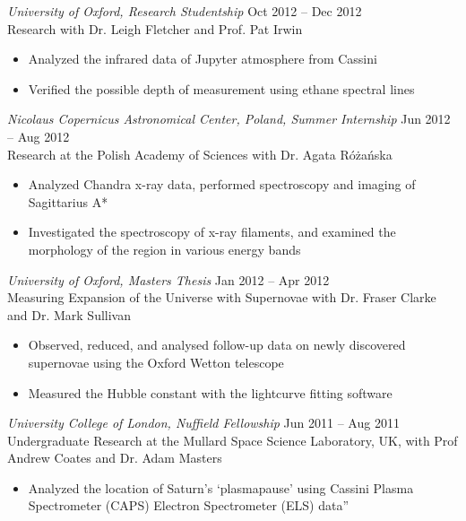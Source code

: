 \documentclass[margin]{res}
\begin{document}
\begin{resume}
{\sl University of Oxford, Research Studentship} \hfill Oct 2012 -- Dec 2012 \\ Research with Dr. Leigh Fletcher and Prof. Pat Irwin
\begin{itemize}
	\item Analyzed the infrared data of Jupyter atmosphere from Cassini 
	\item Verified the possible  depth of measurement using ethane spectral lines
\end{itemize}


{\sl Nicolaus Copernicus Astronomical Center, Poland, Summer Internship}  \hfill   Jun 2012 -- Aug 2012 \\
Research at the Polish Academy of Sciences with Dr. Agata R\'{o}\.{z}a\'{n}ska
\begin{itemize}
	\item Analyzed Chandra x-ray data, performed  spectroscopy and imaging of Sagittarius A*
	\item Investigated the spectroscopy of x-ray filaments, and examined the morphology of the region in various energy bands
\end{itemize}


{\sl University of Oxford,  Masters Thesis} \hfill            Jan 2012 -- Apr 2012 \\
Measuring Expansion of the Universe with Supernovae with Dr. Fraser Clarke and Dr. Mark Sullivan
\begin{itemize}
\item Observed, reduced, and analysed follow-up data on newly discovered supernovae using the  Oxford Wetton telescope
\item Measured the Hubble constant with the lightcurve fitting software 
\end{itemize} 



{\sl University College of London, Nuffield Fellowship} \hfill   Jun 2011 -- Aug 2011 \\
Undergraduate Research at the Mullard Space Science Laboratory, UK, with  Prof Andrew Coates and  Dr. Adam Masters
\begin{itemize}%
\item Analyzed the location of Saturn's ‘plasmapause’ using Cassini Plasma Spectrometer (CAPS) Electron Spectrometer (ELS) data” 
\end{itemize}



\end{resume}
\end{document}
